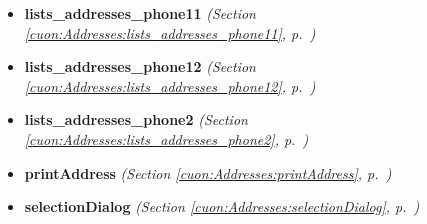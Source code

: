 \begin{itemize}
\item \textbf{lists\_addresses\_phone11}
  \textit{(Section \ref{cuon:Addresses:lists_addresses_phone11}, p.~\pageref{cuon:Addresses:lists_addresses_phone11})}

\item \textbf{lists\_addresses\_phone12}
  \textit{(Section \ref{cuon:Addresses:lists_addresses_phone12}, p.~\pageref{cuon:Addresses:lists_addresses_phone12})}

\item \textbf{lists\_addresses\_phone2}
  \textit{(Section \ref{cuon:Addresses:lists_addresses_phone2}, p.~\pageref{cuon:Addresses:lists_addresses_phone2})}

\item \textbf{printAddress}
  \textit{(Section \ref{cuon:Addresses:printAddress}, p.~\pageref{cuon:Addresses:printAddress})}

\item \textbf{selectionDialog}
  \textit{(Section \ref{cuon:Addresses:selectionDialog}, p.~\pageref{cuon:Addresses:selectionDialog})}

\end{itemize}

